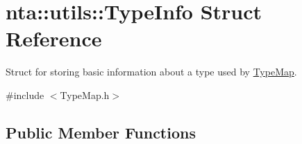 \hypertarget{structnta_1_1utils_1_1TypeInfo}{}\section{nta\+:\+:utils\+:\+:Type\+Info Struct Reference}
\label{structnta_1_1utils_1_1TypeInfo}


Struct for storing basic information about a type used by \hyperlink{classnta_1_1utils_1_1TypeMap}{Type\+Map}.  




{\ttfamily \#include $<$Type\+Map.\+h$>$}

\subsection*{Public Member Functions}
